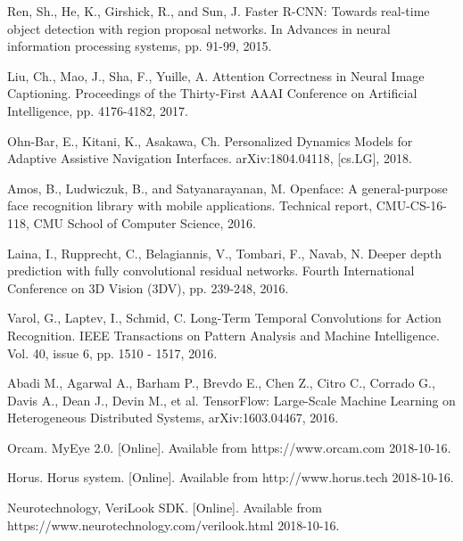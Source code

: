 \documentclass[10pt,conference,compsocconf]{IEEEtran}
\begin{document}
\begin{thebibliography}{99}
 Ren, Sh., He, K., Girshick, R., and Sun, J.  Faster R-CNN: Towards real-time object detection with region proposal networks. In Advances in neural information processing systems, pp. 91-99, 2015.

 Liu, Ch., Mao, J., Sha, F., Yuille, A. Attention Correctness in Neural Image Captioning. Proceedings of the Thirty-First AAAI Conference on Artificial Intelligence, pp. 4176-4182, 2017.

  Ohn-Bar, E., Kitani, K., Asakawa, Ch. Personalized Dynamics Models for Adaptive Assistive Navigation Interfaces. arXiv:1804.04118, [cs.LG], 2018.


 Amos, B., Ludwiczuk, B., and Satyanarayanan, M. Openface:
A general-purpose face recognition library with mobile applications. Technical report, CMU-CS-16-118, CMU School of Computer Science, 2016.


 Laina, I., Rupprecht, C., Belagiannis, V., Tombari, F., Navab, N. Deeper depth prediction with fully convolutional residual networks. Fourth International Conference on 3D Vision (3DV), pp. 239-248, 2016.

 Varol, G., Laptev, I., Schmid, C. Long-Term Temporal Convolutions for Action Recognition.  IEEE Transactions on Pattern Analysis and Machine Intelligence. Vol. 40, issue 6, pp. 1510 - 1517, 2016.

  Abadi M., Agarwal A., Barham P., Brevdo E., Chen Z., Citro C., Corrado G., Davis A., Dean J., Devin M., et al. TensorFlow: Large-Scale Machine Learning on Heterogeneous Distributed Systems, arXiv:1603.04467, 2016. 

 Orcam. MyEye 2.0. [Online]. Available from https://www.orcam.com 2018-10-16.

 Horus. Horus system. [Online]. Available from http://www.horus.tech 2018-10-16.

 Neurotechnology, VeriLook SDK. [Online]. Available from https://www.neurotechnology.com/verilook.html 2018-10-16.


\end{thebibliography}




\end{document}
